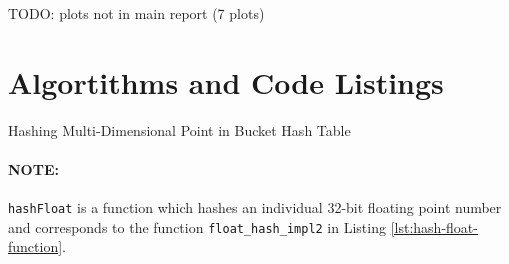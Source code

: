 TODO: plots not in main report (7 plots)

\section{Algortithms and Code Listings}

\begin{algorithm}[H]
	\SetAlgoLined
	 

  	 {
	}

	\caption{Hashing Multi-Dimensional Point in Bucket Hash Table}
	\label{alg:point-hashing}
\end{algorithm}

\paragraph{\textbf{NOTE:}} \texttt{hashFloat} is a function which hashes an individual 32-bit floating point number and corresponds to the function \texttt{float\_hash\_impl2} in Listing \ref{lst:hash-float-function}.

\paragraph{} 

